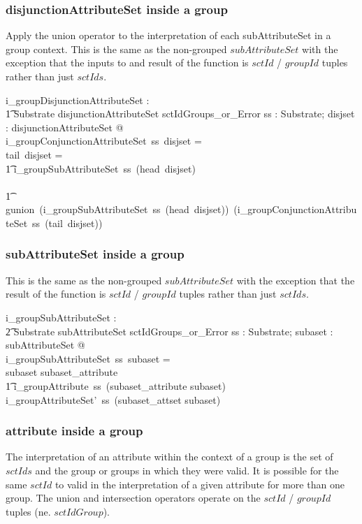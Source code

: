 \documentclass{article}
\begin{document}
\subsubsection{disjunctionAttributeSet inside a group}
Apply the union operator to the interpretation of each  subAttributeSet in a group context.  This is the same as the non-grouped $subAttributeSet$ with the exception that the inputs to and result of the function is $sctId$ / $groupId$ tuples rather than
just $sctIds$.


\begin{axdef}
    i\_groupDisjunctionAttributeSet : \\
\t1 Substrate \fun disjunctionAttributeSet \fun sctIdGroups\_or\_Error
\where
   \forall ss : Substrate;  disjset : disjunctionAttributeSet @ \\
   i\_groupConjunctionAttributeSet~ss~disjset = ~ \\
   \IF tail~disjset = \langle \rangle \THEN \\
   \t1  i\_groupSubAttributeSet~ss~(head~disjset) \\
\ELSE \\
\t1 gunion~(i\_groupSubAttributeSet~ss~(head~disjset))~(i\_groupConjunctionAttributeSet~ss~(tail~disjset))
\end{axdef}

\subsubsection{subAttributeSet inside a group}
This is the same as the non-grouped $subAttributeSet$ with the exception that the result of the function is $sctId$ / $groupId$ tuples rather than
just $sctIds$.


\begin{axdef}
   i\_groupSubAttributeSet : \\
\t2 Substrate \fun subAttributeSet \fun sctIdGroups\_or\_Error 
\where
   \forall ss : Substrate; subaset : subAttributeSet @ \\
   i\_groupSubAttributeSet~ss~subaset = \\
   \IF subaset \in \ran subaset\_attribute \\
\t1 \THEN i\_groupAttribute~ss~(subaset\_attribute \inv subaset) \\
  \ELSE i\_groupAttributeSet'~ss~(subaset\_attset \inv subaset)
\end{axdef}



\subsubsection{attribute inside a group}
The interpretation of an attribute within the context of a group is the set of $sctIds$ and the group or groups in which
they were valid.  It is possible for the same $sctId$ to valid in the interpretation of a given attribute for more than one group.
The union and intersection operators operate on the $sctId$ / $groupId$ tuples (ne. $sctIdGroup$).
\end{document}
